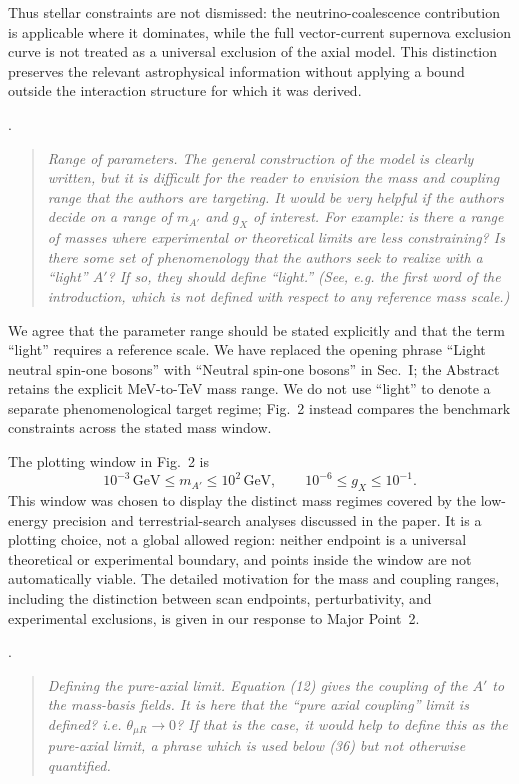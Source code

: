 \documentclass[12pt,a4paper]{article}
\begin{document}
Thus stellar constraints are not dismissed: the neutrino-coalescence contribution is applicable where it dominates, while the full vector-current supernova exclusion curve is not treated as a universal exclusion of the axial model. This distinction preserves the relevant astrophysical information without applying a bound outside the interaction structure for which it was derived.

\medskip
{}. \begin{quote}\itshape
Range of parameters. The general construction of the model is clearly written, but it is difficult for the reader to envision the mass and coupling range that the authors are targeting. It would be very helpful if the authors decide on a range of \(m_{A'}\) and \(g_X\) of interest. For example: is there a range of masses where experimental or theoretical limits are less constraining? Is there some set of phenomenology that the authors seek to realize with a ``light'' \(A'\)? If so, they should define ``light.'' (See, e.g. the first word of the introduction, which is not defined with respect to any reference mass scale.)\end{quote}

We agree that the parameter range should be stated explicitly and that the term ``light'' requires a reference scale. We have replaced the opening phrase ``Light neutral spin-one bosons'' with ``Neutral spin-one bosons'' in Sec.~I; the Abstract retains the explicit MeV-to-TeV mass range. We do not use ``light'' to denote a separate phenomenological target regime; Fig.~2 instead compares the benchmark constraints across the stated mass window.

The plotting window in Fig.~2 is
\[
10^{-3}\,\mathrm{GeV}\leq m_{A'}\leq10^2\,\mathrm{GeV},
\qquad
10^{-6}\leq g_X\leq10^{-1}.
\]
This window was chosen to display the distinct mass regimes covered by the low-energy precision and terrestrial-search analyses discussed in the paper. It is a plotting choice, not a global allowed region: neither endpoint is a universal theoretical or experimental boundary, and points inside the window are not automatically viable. The detailed motivation for the mass and coupling ranges, including the distinction between scan endpoints, perturbativity, and experimental exclusions, is given in our response to Major Point~2.

\medskip
{}.
\begin{quote}\itshape
Defining the pure-axial limit. Equation (12) gives the coupling of the \(A'\) to the mass-basis fields. It is here that the ``pure axial coupling'' limit is defined? i.e. \(\theta_{\mu R}\to0\)? If that is the case, it would help to define this as the pure-axial limit, a phrase which is used below (36) but not otherwise quantified.
\end{quote}
\end{document}
